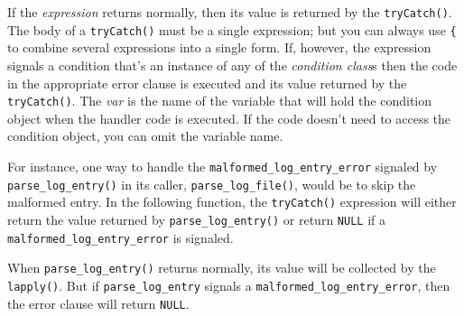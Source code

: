\begin{Shaded}
\begin{Highlighting}[]
   
   
\NormalTok{)}
\end{Highlighting}
\end{Shaded}

If the \emph{expression} returns normally, then its value is returned by
the \texttt{tryCatch()}. The body of a \texttt{tryCatch()} must be a
single expression; but you can always use \texttt{\{} to combine several
expressions into a single form. If, however, the expression signals a
condition that's an instance of any of the \emph{condition class}s then
the code in the appropriate error clause is executed and its value
returned by the \texttt{tryCatch()}. The \emph{var} is the name of the
variable that will hold the condition object when the handler code is
executed. If the code doesn't need to access the condition object, you
can omit the variable name.

For instance, one way to handle the
\texttt{malformed\_log\_entry\_error} signaled by
\texttt{parse\_log\_entry()} in its caller, \texttt{parse\_log\_file()},
would be to skip the malformed entry. In the following function, the
\texttt{tryCatch()} expression will either return the value returned by
\texttt{parse\_log\_entry()} or return \texttt{NULL} if a
\texttt{malformed\_log\_entry\_error} is signaled.

\begin{Shaded}
\begin{Highlighting}[]
\StringTok{ }
\StringTok{ }
  
    \NormalTok{(}
       \NormalTok{,}
\NormalTok{    )}
\NormalTok{  \})}
\NormalTok{\}}
\end{Highlighting}
\end{Shaded}

When \texttt{parse\_log\_entry()} returns normally, its value will be
collected by the \texttt{lapply()}. But if \texttt{parse\_log\_entry}
signals a \texttt{malformed\_log\_entry\_error}, then the error clause
will return \texttt{NULL}.

